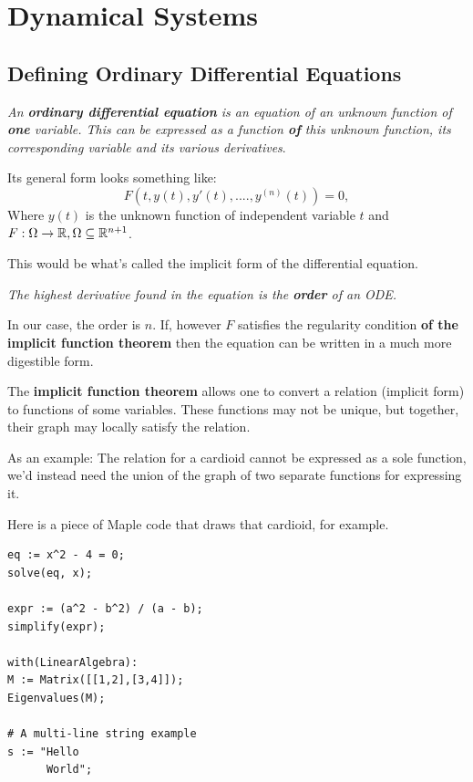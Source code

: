 \chapter{Dynamical Systems}
\label{chap:ch3}

\section{Defining Ordinary Differential Equations}
\cite{hunter2011introduction,binegar2008,maryland2022}
\begin{definition}
	\textit{An \textbf{ordinary differential equation} is an equation of an unknown function of \textbf{one} variable. This can be expressed as a function \textbf{of} this unknown function, its corresponding variable and its various derivatives}.
\end{definition}
Its general form looks something like:
\begin{equation}\label{ODE}
	F(t,y(t),y'(t),....,y^{(n)}(t))=0,
\end{equation}
Where $y(t)$ is the unknown function of independent variable $t$ and $F : \Omega \rightarrow \mathbb{R},  \\ \Omega \subseteq \mathbb{R}^{n+1}$.

This would be what's called the implicit form of the differential equation.

\begin{definition}
	\textit{The highest derivative found in the equation is the \textbf{order} of an ODE.}
\end{definition}
In our case, the order is $n$.
If, however $F$ satisfies the regularity condition \textbf{of the implicit function theorem} then the equation can be written in a much more digestible form.

The \textbf{implicit function theorem} allows one to convert a relation (implicit form) to functions of some variables. These functions may not be unique, but together, their graph may locally satisfy the relation.

As an example: The relation for a cardioid cannot be expressed as a sole function, we'd instead need the union of the graph of two separate functions for expressing it.

Here is a piece of Maple code that draws that cardioid, for example.

\begin{verbatim}
eq := x^2 - 4 = 0;
solve(eq, x);

expr := (a^2 - b^2) / (a - b);
simplify(expr);

with(LinearAlgebra):
M := Matrix([[1,2],[3,4]]);
Eigenvalues(M);

# A multi-line string example
s := "Hello
      World";
\end{verbatim}

